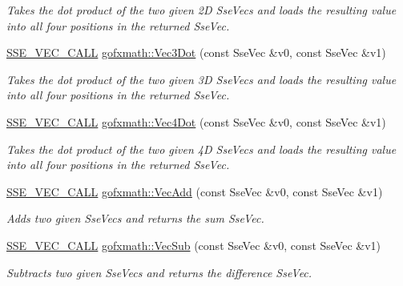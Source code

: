 \begin{DoxyCompactItemize}
\begin{DoxyCompactList}\small\item\em Takes the dot product of the two given 2\+D Sse\+Vecs and loads the resulting value into all four positions in the returned Sse\+Vec. \end{DoxyCompactList}\item 
\hyperlink{ssevec__math__defs_8h_a97454f977a5281455cecacce1e8ba670}{S\+S\+E\+\_\+\+V\+E\+C\+\_\+\+C\+A\+L\+L} \hyperlink{group___s_i_m_d_vec_math_ga9c49b81f2971aa5fbc103517738fbef2}{gofxmath\+::\+Vec3\+Dot} (const Sse\+Vec \&v0, const Sse\+Vec \&v1)
\begin{DoxyCompactList}\small\item\em Takes the dot product of the two given 3\+D Sse\+Vecs and loads the resulting value into all four positions in the returned Sse\+Vec. \end{DoxyCompactList}\item 
\hyperlink{ssevec__math__defs_8h_a97454f977a5281455cecacce1e8ba670}{S\+S\+E\+\_\+\+V\+E\+C\+\_\+\+C\+A\+L\+L} \hyperlink{group___s_i_m_d_vec_math_gaad124f4ea11c4c588206b762284c86d7}{gofxmath\+::\+Vec4\+Dot} (const Sse\+Vec \&v0, const Sse\+Vec \&v1)
\begin{DoxyCompactList}\small\item\em Takes the dot product of the two given 4\+D Sse\+Vecs and loads the resulting value into all four positions in the returned Sse\+Vec. \end{DoxyCompactList}\item 
\hyperlink{ssevec__math__defs_8h_a97454f977a5281455cecacce1e8ba670}{S\+S\+E\+\_\+\+V\+E\+C\+\_\+\+C\+A\+L\+L} \hyperlink{group___s_i_m_d_vec_math_ga69a2cb46cd6fcbe12e62c7d9c28598f1}{gofxmath\+::\+Vec\+Add} (const Sse\+Vec \&v0, const Sse\+Vec \&v1)
\begin{DoxyCompactList}\small\item\em Adds two given Sse\+Vecs and returns the sum Sse\+Vec. \end{DoxyCompactList}\item 
\hyperlink{ssevec__math__defs_8h_a97454f977a5281455cecacce1e8ba670}{S\+S\+E\+\_\+\+V\+E\+C\+\_\+\+C\+A\+L\+L} \hyperlink{group___s_i_m_d_vec_math_ga6f3fc6f79d25a89eab0633445544af3f}{gofxmath\+::\+Vec\+Sub} (const Sse\+Vec \&v0, const Sse\+Vec \&v1)
\begin{DoxyCompactList}\small\item\em Subtracts two given Sse\+Vecs and returns the difference Sse\+Vec. \end{DoxyCompactList}\item 

\end{DoxyCompactItemize}
